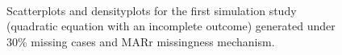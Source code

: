 \begin{figure}[t]
\begin{center}
{{				}
			}\\ 	
		\end{center}
		\caption{Scatterplots and densityplots for the first simulation study (quadratic equation with an incomplete outcome) generated under 30\% missing cases and MARr missingness mechanism.}
		\label{fig6_3}
	\end{figure}
	

